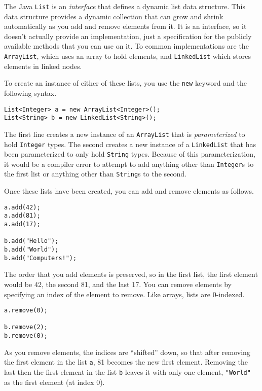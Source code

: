 The Java \texttt{List} is an \emph{interface} that
defines a dynamic list data structure.  This data structure
provides a dynamic collection that can grow and shrink 
automatically as you add and remove elements from it.  It
is an interface, so it doesn't actually provide an implementation, 
just a specification for the publicly available methods that
you can use on it.  To common implementations are the 
\texttt{ArrayList}, which uses an array to hold 
elements, and \texttt{LinkedList} which stores
elements in linked nodes.

To create an instance of either of these lists, you use the
\texttt{new} keyword and the following syntax.

\begin{verbatim}
List<Integer> a = new ArrayList<Integer>();
List<String> b = new LinkedList<String>();
\end{verbatim}

The first line creates a new instance of an \texttt{ArrayList}
that is \emph{parameterized} to hold \texttt{Integer} 
types.  The second creates a new instance of a \texttt{LinkedList}
that has been parameterized to only hold \texttt{String}
types.  Because of this parameterization, it would be a 
compiler error to attempt to add anything other than \texttt{Integer}s
to the first list or anything other than \texttt{String}s to the
second.

Once these lists have been created, you can add and remove
elements as follows.

\begin{verbatim}
a.add(42);
a.add(81);
a.add(17);

b.add("Hello");
b.add("World");
b.add("Computers!");
\end{verbatim}

The order that you add elements is preserved, so in the first list, the
first element would be 42, the second 81, and the last 17.  You can
remove elements by specifying an index of the element to remove.
Like arrays, lists are 0-indexed.

\begin{verbatim}
a.remove(0);

b.remove(2);
b.remove(0);
\end{verbatim}

As you remove elements, the indices are ``shifted'' down, so that after
removing the first element in the list \texttt{a}, 81 becomes
the new first element.  Removing the last then the first element in the
list \texttt{b} leaves it with only one element, \texttt{"World"}
as the first element (at index 0).


